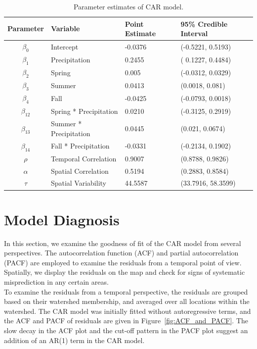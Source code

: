 \documentclass{svjour3}
\begin{document}
\begin{table}[htbp]
\caption{Parameter estimates of CAR model.}
\centering
\begin{tabular}{|c|l|l|l|}
\hline
Parameter &  Variable &   Point Estimate & 95\%  Credible Interval\\ \hline
$ \beta_0$ & Intercept  &-0.0376  & (-0.5221,  0.5193)\\ \hline
$ \beta_1$ & Precipitation  & 0.2455 & ( 0.1227,   0.4484)\\ \hline
$ \beta_2$ & Spring  &  0.005 & (-0.0312,  0.0329) \\ \hline

$ \beta_3$ & Summer & 0.0413 & (0.0018, 0.081) \\ \hline
$ \beta_4$ & Fall  & -0.0425 & (-0.0793,  0.0018)\\ \hline

$ \beta_{12}$ & Spring * Precipitation & 0.0210  & (-0.3125,    0.2919)\\  \hline
$ \beta_{13}$ & Summer * Precipitation  & 0.0445  & (0.021,    0.0674)\\  \hline
$ \beta_{14}$ & Fall * Precipitation  & -0.0331  & (-0.2134,    0.1902)\\  \hline

$ \rho$ & Temporal Correlation &  0.9007  & (0.8788,   0.9826)\\  \hline
$ \alpha$ & Spatial Correlation  & 0.5194 &  (0.2883,   0.8584) \\ \hline
$ \tau$ & Spatial Variability &44.5587 & (33.7916,  58.3599)\\ \hline
\end{tabular}
\label{parameter estimate}
\end{table}

\section{Model Diagnosis}\label{sec:diag}
In this section, we examine the goodness of fit of the CAR model from several perspectives.
The autocorrelation function (ACF) and partial autocorrelation (PACF) are employed to examine the residuals from a temporal point of view.
Spatially, we display the residuals on the map and check for signs of systematic misprediction in any certain areas.  \\

To examine the residuals from a temporal perspective, the residuals are grouped based on their watershed membership, and averaged over all locations within the watershed.
The CAR model was initially fitted without autoregressive terms, and the ACF and PACF of residuals are given in Figure~\ref{fig:ACF_and_PACF}.
The  slow decay in the ACF plot and the cut-off pattern in the PACF plot suggest an addition of an AR(1) term in the CAR model.\\
\end{document}
